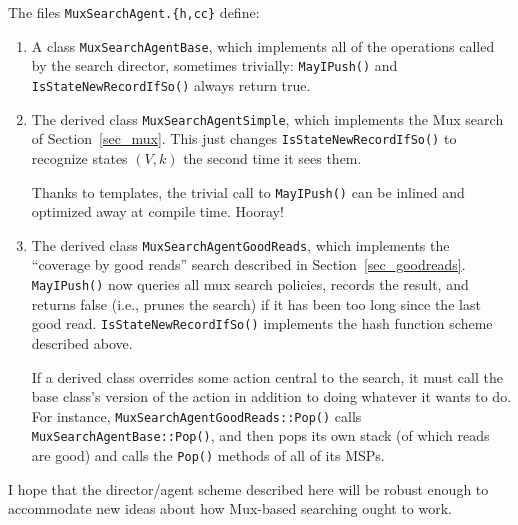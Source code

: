 \documentclass[11pt]{article}
\begin{document}
The files \verb"MuxSearchAgent.{h,cc}" define:
\begin{enumerate}
\item 
A class {\tt MuxSearchAgentBase}, which implements all of the operations called by 
the search director, sometimes trivially: 
\verb"MayIPush()" and \verb"IsStateNewRecordIfSo()" always return true.

\item
The derived class {\tt MuxSearchAgentSimple}, which implements the Mux search 
of Section~\ref{sec_mux}.
This just changes \verb"IsStateNewRecordIfSo()" to recognize states $(V,k)$
the second time it sees them.

Thanks to templates, the trivial call to \verb"MayIPush()" can be inlined and
optimized away at compile time.  Hooray!

\item
The derived class {\tt MuxSearchAgentGoodReads}, which implements the
``coverage by good reads'' search described in Section~\ref{sec_goodreads}.
\verb"MayIPush()" now queries all mux search policies, records the result, and
returns false (i.e., prunes the search) if it has been too long since the last good read.
\verb"IsStateNewRecordIfSo()" implements the hash function scheme described above.

If a derived class overrides some action central to the search, it must call the base
class's version of the action in addition to doing whatever it wants to do.  For instance,
\verb"MuxSearchAgentGoodReads::Pop()" calls \verb"MuxSearchAgentBase::Pop()",
and then pops its own stack (of which reads are good) and calls the \verb"Pop()"
methods of all of its MSPs.
\end{enumerate}

I hope that the director/agent scheme described here will be robust enough to
accommodate new ideas about how Mux-based searching ought to work.
\end{document}
